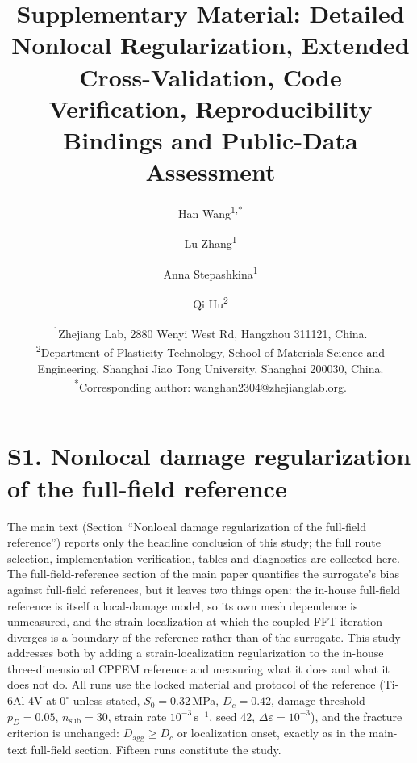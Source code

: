 \documentclass[11pt,a4paper,twocolumn]{article}
\title{\textbf{Supplementary Material: Detailed Nonlocal Regularization, Extended Cross-Validation, Code Verification, Reproducibility Bindings and Public-Data Assessment}}
\author{Han Wang\textsuperscript{1,*}\and Lu Zhang\textsuperscript{1}\and Anna Stepashkina\textsuperscript{1}\and Qi Hu\textsuperscript{2}}
\date{{\small\textsuperscript{1}Zhejiang Lab, 2880 Wenyi West Rd, Hangzhou 311121, China.\\[3pt]\textsuperscript{2}Department of Plasticity Technology, School of Materials Science and Engineering, Shanghai Jiao Tong University, Shanghai 200030, China.\\[3pt]\textsuperscript{*}Corresponding author: wanghan2304@zhejianglab.org.}}
\providecommand{\ang}[1]{\ensuremath{#1^{\circ}}}
\begin{document}
\maketitle

\section*{S1. Nonlocal damage regularization of the full-field reference}

The main text (Section~``Nonlocal damage regularization of the full-field reference'') reports only the
headline conclusion of this study; the full route selection, implementation verification, tables and
diagnostics are collected here. The full-field-reference section of the main paper quantifies the surrogate's
bias against full-field references, but it leaves two things open: the in-house full-field reference is
itself a local-damage model, so its own mesh dependence is unmeasured, and the strain localization at which
the coupled FFT iteration diverges is a boundary of the reference rather than of the surrogate. This study
addresses both by adding a strain-localization regularization to the in-house three-dimensional CPFEM
reference and measuring what it does and what it does not do. All runs use the locked material and protocol
of the reference (Ti-6Al-4V at $\ang{0}$ unless stated, $S_0 = 0.32$\,MPa, $D_c = 0.42$, damage threshold
$p_D = 0.05$, $n_{\mathrm{sub}} = 30$, strain rate $10^{-3}\,\mathrm{s}^{-1}$, seed 42,
$\Delta\varepsilon = 10^{-3}$), and the fracture criterion is unchanged: $D_{\mathrm{agg}} \ge D_c$ or
localization onset, exactly as in the main-text full-field section. Fifteen runs constitute the study.
\end{document}
